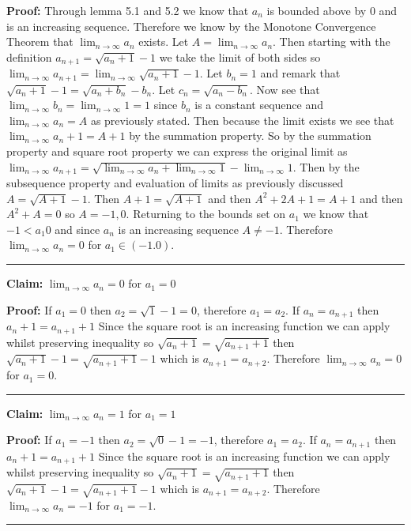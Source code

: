 \documentclass[10pt,letterpaper]{article}
\newcommand\ds{\displaystyle}
\newcommand\qedsym{\hfill \rule{2mm}{2mm}}
\begin{document}
{\medskip

\textbf{Proof:} Through lemma 5.1 and 5.2 we know that $a_n$ is bounded above by $0$ and is an increasing sequence. Therefore we know by the Monotone Convergence Theorem that $\ds\lim_{n\to\infty} a_n$ exists. Let $A = \ds\lim_{n\to\infty}a_n$. Then starting with the definition $a_{n+1} = \sqrt{a_{n} +1} - 1$ we take the limit of both sides so $\ds\lim_{n\to\infty}a_{n+1} = \ds\lim_{n\to\infty}\sqrt{a_{n} +1} - 1$. Let $b_n = 1$ and remark that $\sqrt{a_n + 1} -1 = \sqrt{a_n + b_n} - b_n$. Let $c_n = \sqrt{a_n - b_n}$. Now see that $\ds\lim_{n\to\infty} b_n = \ds\lim_{n\to\infty} 1 = 1$ since $b_n$ is a constant sequence and $\ds\lim_{n\to\infty} a_n = A$ as previously stated. Then because the limit exists we see that $\ds\lim_{n\to\infty} a_n + 1 = A + 1$ by the summation property. So by the summation property and square root property we can express the original limit as $\ds\lim_{n\to\infty}a_{n+1} = \sqrt{\ds\lim_{n\to\infty}a_{n} +\ds\lim_{n\to\infty}1} - \ds\lim_{n\to\infty}1$. Then by the subsequence property and evaluation of limits as previously discussed $A = \sqrt{A+1}-1$. Then $A+1 = \sqrt{A+1}$ and then $A^2 + 2A + 1 = A + 1$ and then $A^2 + A = 0$ so $A = -1, 0$. Returning to the bounds set on $a_1$ we know that $-1 < a_1 0$ and since $a_n$ is an increasing sequence $A \neq -1$. Therefore $\ds\lim_{n\to\infty} a_{n} = 0$ for $a_1 \in (-1. 0)$. \qedsym{}

\medskip

\textbf{Claim:} $\ds\lim_{n\to\infty} a_{n} = 0$ for $a_1 = 0$

\medskip

\textbf{Proof:} If $a_1 = 0$ then $a_2 = \sqrt{1} - 1 = 0$, therefore $a_1 = a_2$. If $a_n = a_{n+1}$ then $a_n + 1= a_{n+1} +1$ Since the square root is an increasing function we can apply whilst preserving inequality so $\sqrt{a_n + 1} = \sqrt{a_{n+1} +1}$ then $\sqrt{a_n + 1} - 1 = \sqrt{a_{n+1} +1} - 1$ which is $a_{n+1} = a_{n+2}$. Therefore $\ds\lim_{n\to\infty} a_{n} = 0$ for $a_1 = 0$. \qedsym{}

\medskip

\textbf{Claim:} $\ds\lim_{n\to\infty} a_{n} = 1$ for $a_1 = 1$

\medskip

\textbf{Proof:} If $a_1 = -1$ then $a_2 = \sqrt{0} - 1 = -1$, therefore $a_1 = a_2$. If $a_n = a_{n+1}$ then $a_n + 1= a_{n+1} +1$ Since the square root is an increasing function we can apply whilst preserving inequality so $\sqrt{a_n + 1} = \sqrt{a_{n+1} +1}$ then $\sqrt{a_n + 1} - 1 = \sqrt{a_{n+1} +1} - 1$ which is $a_{n+1} = a_{n+2}$. Therefore $\ds\lim_{n\to\infty} a_{n} = -1$ for $a_1 = -1$. \qedsym{}

}
\end{document}
